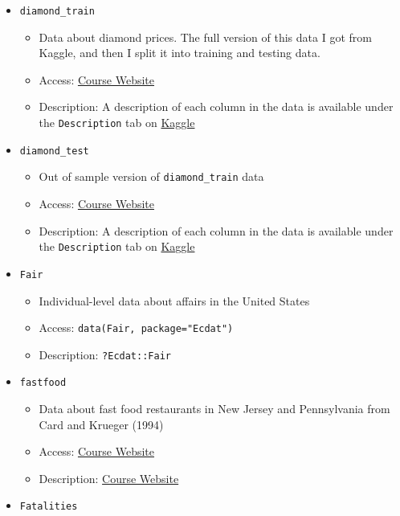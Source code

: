 \documentclass[
  letterpaper,
  DIV=11,
  numbers=noendperiod]{scrreprt}
\begin{document}
\begin{itemize}
  \begin{itemize}
  \item
    School-level test score data from California in 1998-1999
  \item
    Access: \texttt{data(Caschool,\ package="Ecdat")}
  \item
    Description: \texttt{?Ecdat::Caschool}
  \end{itemize}
\item
  \texttt{diamond\_train}

  \begin{itemize}
  \item
    Data about diamond prices. The full version of this data I got from
    Kaggle, and then I split it into training and testing data.
  \item
    Access: \href{\%60r\%20course_website_link\%60}{Course Website}
  \item
    Description: A description of each column in the data is available
    under the \texttt{Description} tab on
    \href{https://www.kaggle.com/shivam2503/diamonds/}{Kaggle}
  \end{itemize}
\item
  \texttt{diamond\_test}

  \begin{itemize}
  \item
    Out of sample version of \texttt{diamond\_train} data
  \item
    Access: \href{\%60r\%20course_website_link\%60}{Course Website}
  \item
    Description: A description of each column in the data is available
    under the \texttt{Description} tab on
    \href{https://www.kaggle.com/shivam2503/diamonds/}{Kaggle}
  \end{itemize}
\item
  \texttt{Fair}

  \begin{itemize}
  \item
    Individual-level data about affairs in the United States
  \item
    Access: \texttt{data(Fair,\ package="Ecdat")}
  \item
    Description: \texttt{?Ecdat::Fair}
  \end{itemize}
\item
  \texttt{fastfood}

  \begin{itemize}
  \item
    Data about fast food restaurants in New Jersey and Pennsylvania from
    Card and Krueger (1994)
  \item
    Access: \href{\%60r\%20course_website_link\%60}{Course Website}
  \item
    Description: \href{\%60r\%20course_website_link\%60}{Course Website}
  \end{itemize}
\item
  \texttt{Fatalities}


\end{itemize}
\end{document}
